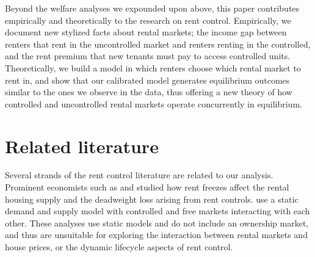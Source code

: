 \documentclass[parskip=full]{article}
\begin{document}
Beyond the welfare analyses we expounded upon above, this paper contributes empirically and theoretically to the research on rent control. Empirically, we document new stylized facts about rental markets; the income gap between renters that rent in the uncontrolled market and renters renting in the controlled, and the rent premium that new tenants must pay to access controlled units. Theoretically, we build a model in which renters choose which rental market to rent in, and show that our calibrated model generates equilibrium outcomes similar to the ones we observe in the data, thus offering a new theory of how controlled and uncontrolled rental markets operate concurrently in equilibrium.


\section{Related literature}\label{sec:related_lit}

Several strands of the rent control literature are related to our analysis. Prominent economists such as \citet{hayek-1929} and \citet{fs-1946} studied how rent freezes affect the rental housing supply and the deadweight loss arising from rent controls. \citet{fallis-1985} use a static demand and supply model with controlled and free markets interacting with each other. These analyses use static models and do not include an ownership market, and thus are unsuitable for exploring the interaction between rental markets and house prices, or the dynamic lifecycle aspects of rent control.
\end{document}

